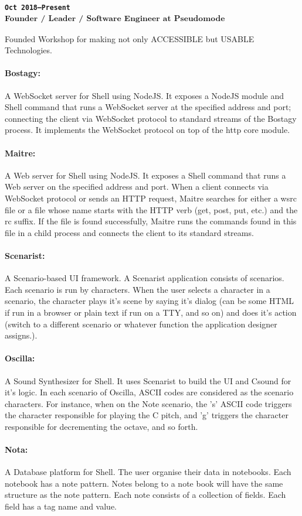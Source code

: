 \subsubsection{\textsubscript{\uppercase{\texttt{Oct 2018--Present}}\\
Founder / Leader / Software Engineer at Pseudomode}}
Founded Workshop for making not only \uppercase{accessible} but \uppercase{usable} Technologies.
\paragraph{Bostagy:}
A WebSocket server for Shell using NodeJS.
It exposes a NodeJS module and Shell command that runs a WebSocket server at the specified address and port;
connecting the client via WebSocket protocol to standard streams of the Bostagy process.
It implements the WebSocket protocol on top of the http core module.
\paragraph{Maitre:}
A Web server for Shell using NodeJS.
It exposes a Shell command that runs a Web server on the specified address and port.
When a client connects via WebSocket protocol or sends an HTTP request,
Maitre searches for either a wsrc file or a file whose name starts with the HTTP verb (get, post, put, etc.) and the rc suffix.
If the file is found successfully, Maitre runs the commands found in this file in a child process and connects the client to its standard streams.
\paragraph{Scenarist:}
A Scenario-based UI framework.
A Scenarist application consists of scenarios.
Each scenario is run by characters.
When the user selects a character in a scenario,
the character plays it's scene by saying it's dialog (can be some HTML if run in a browser or plain text if run on a TTY, and so on)
and does it's action (switch to a different scenario or whatever function the application designer assigns.).
\paragraph{Oscilla:}
A Sound Synthesizer for Shell.
It uses Scenarist to build the UI and Csound for it's logic.
In each scenario of Oscilla,
ASCII codes are considered as the scenario characters.
For instance, when on the Note scenario,
the 's' ASCII code triggers the character responsible for playing the C pitch,
and 'g' triggers the character responsible for decrementing the octave, and so forth.
\paragraph{Nota:}
A Database platform for Shell.
The user organise their data in notebooks.
Each notebook has a note pattern.
Notes belong to a note book will have the same structure as the note pattern.
Each note consists of a collection of fields.
Each field has a tag name and value.
